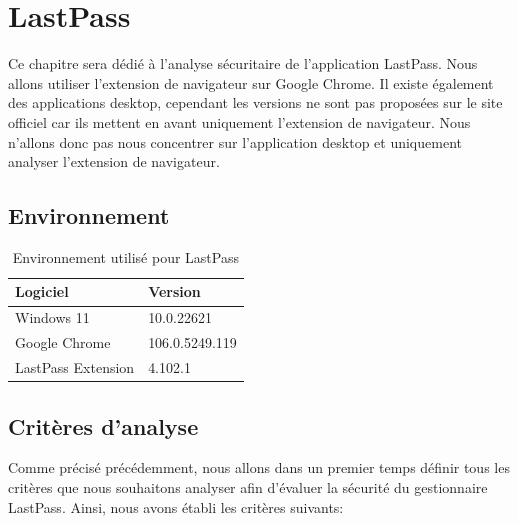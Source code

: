 
\chapter{LastPass}
\label{ch:lastpass}

Ce chapitre sera dédié à l'analyse sécuritaire de l'application LastPass. Nous allons utiliser l'extension de navigateur sur Google Chrome. Il existe également des applications desktop, cependant les versions ne sont pas proposées sur le site officiel car ils mettent en avant uniquement l'extension de navigateur. Nous n'allons donc pas nous concentrer sur l'application desktop et uniquement analyser l'extension de navigateur. 

\section{Environnement}

\begin{table}[H]
	\centering
	\begin{tabular}{ll}
		\hline
		Logiciel           & Version        \\ \hline
		Windows 11         & 10.0.22621     \\
		Google Chrome      & 106.0.5249.119 \\
		LastPass Extension & 4.102.1        \\ \hline
	\end{tabular}
\caption{Environnement utilisé pour LastPass}
\end{table}

\section{Critères d'analyse}

Comme précisé précédemment, nous allons dans un premier temps définir tous les critères que nous souhaitons analyser
afin d'évaluer la sécurité du gestionnaire LastPass. Ainsi, nous avons établi les critères suivants:

